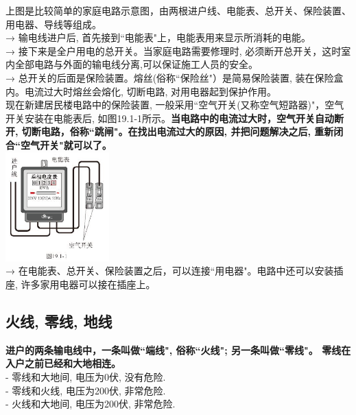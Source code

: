 \documentclass[UTF8]{ctexart}
\begin{document}
上图是比较简单的家庭电路示意图，由两根进户线、电能表、总开关、保险装置、用电器、导线等组成。 \\
→ 输电线进户后, 首先接到``电能表"上，电能表用来显示所消耗的电能。 \\
→ 接下来是全户用电的总开关。当家庭电路需要修理时, 必须断开总开关，这时室内全部电路与外面的输电线分离,可以保证施工人员的安全。 \\
→ 总开关的后面是保险装置。熔丝(俗称``保险丝"）是简易保险装置, 装在保险盒内。电流过大时熔丝会熔化, 切断电路, 对用电器起到保护作用。 \\
现在新建居民楼电路中的保险装置, 一般采用``空气开关(又称空气短路器)"，空气开关安装在电能表后, 如图19.1-1所示。\textbf{当电路中的电流过大时，空气开关自动断开, 切断电路，俗称``跳闸"。在找出电流过大的原因, 并把问题解决之后, 重新闭合``空气开关"就可以了。} \\

\includegraphics[width=0.3\textwidth]{img/0062.png} \\

→ 在电能表、总开关、保险装置之后，可以连接``用电器"。电路中还可以安装插座, 许多家用电器可以接在插座上。\\

\vspace{1em} 

\subsection{火线, 零线, 地线}

\textbf{进户的两条输电线中，一条叫做``端线", 俗称``火线"; 另一条叫做``零线"。 零线在入户之前已经和大地相连。} \\
- 零线和大地间, 电压为0伏, 没有危险. \\
- 零线和火线, 电压为200伏, 非常危险. \\
- 火线和大地间, 电压为200伏, 非常危险. \\
\end{document}
